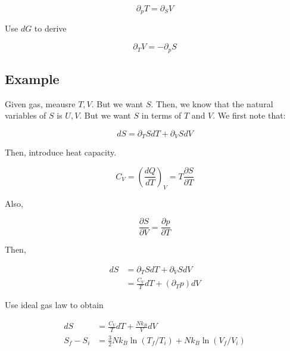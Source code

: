 \documentclass{article}
\newtheorem{one minute paper}[theorem]{One Minute Paper}
\begin{document}
\begin{equation}
    \partial_p T = \partial_S V
\end{equation}

Use $dG$ to derive 

\begin{equation}
    \partial_T V = -\partial_p S
\end{equation}

\subsection*{Example}

Given gas, meausre $T,V$. But we want $S$. Then, we know that the natural variables of $S$ is $U,V$.
But we want $S$ in terms of $T$ and $V$. We first note that:

\begin{equation}
    dS = \partial_T S dT + \partial_V S dV
\end{equation}

Then, introduce heat capacity. 

\begin{equation}
    C_V = \left( \frac{dQ}{dT} \right)_V = T \frac{\partial S}{\partial T}
\end{equation}

Also, 

\begin{equation}
    \frac{\partial S}{\partial V} = \frac{\partial p}{\partial T}
\end{equation}

Then, 

\begin{align}
    dS &= \partial_T S dT + \partial_V S dV \\
    &= \frac{C_V}{T}dT + \left( \partial_T p \right) dV
\end{align}

Use ideal gas law to obtain 

\begin{align}
    dS &= \frac{C_V}{T}dT + \frac{Nk_B}{V}dV\\
    S_f - S_i &= \frac{3}{2}Nk_B \ln\left( T_f/T_i \right) + Nk_B \ln\left( V_f/V_i \right)
\end{align}
\end{document}
